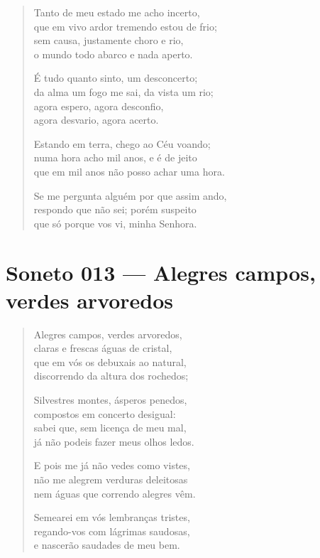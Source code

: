 \documentclass[10pt,a5paper,oneside]{book}
\begin{document}
\begin{verse}
Tanto de meu estado me acho incerto,\\
que em vivo ardor tremendo estou de frio;\\
sem causa, justamente choro e rio,\\
o mundo todo abarco e nada aperto.

É tudo quanto sinto, um desconcerto;\\
da alma um fogo me sai, da vista um rio;\\
agora espero, agora desconfio,\\
agora desvario, agora acerto.

Estando em terra, chego ao Céu voando;\\
numa hora acho mil anos, e é de jeito\\
que em mil anos não posso achar uma hora.

Se me pergunta alguém por que assim ando,\\
respondo que não sei; porém suspeito\\
que só porque vos vi, minha Senhora.
\end{verse}

\chapter{Soneto 013 --- Alegres campos, verdes arvoredos}

\begin{verse}
Alegres campos, verdes arvoredos,\\
claras e frescas águas de cristal,\\
que em vós os debuxais ao natural,\\
discorrendo da altura dos rochedos;

Silvestres montes, ásperos penedos,\\
compostos em concerto desigual:\\
sabei que, sem licença de meu mal,\\
já não podeis fazer meus olhos ledos.

E pois me já não vedes como vistes,\\
não me alegrem verduras deleitosas\\
nem águas que correndo alegres vêm.

Semearei em vós lembranças tristes,\\
regando-vos com lágrimas saudosas,\\
e nascerão saudades de meu bem.
\end{verse}
\end{document}
